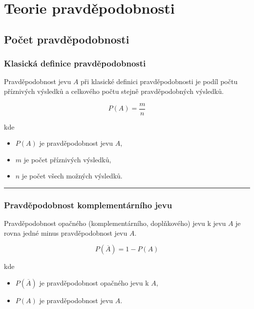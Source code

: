 \documentclass[a4paper, 11pt]{article}
\begin{document}
\clearpage
\section{Teorie pravděpodobnosti}

\subsection{Počet pravděpodobnosti}

\subsubsection{Klasická definice pravděpodobnosti}

Pravděpodobnost jevu $A$ při klasické definici pravděpodobnosti
je podíl počtu příznivých výsledků a celkového počtu
stejně pravděpodobných výsledků.

\begin{equation*}
	P(A) = \frac{m}{n}
\end{equation*}

kde

\begin{itemize}[noitemsep]
	\item $P(A)$ je pravděpodobnost jevu $A$,
	\item $m$ je počet příznivých výsledků,
	\item $n$ je počet všech možných výsledků.
\end{itemize}

\noindent\hrule\medskip

\subsubsection{Pravděpodobnost komplementárního jevu}

Pravděpodobnost opačného (komplementárního, doplňkového) jevu k jevu $A$
je rovna jedné minus pravděpodobnost jevu $A$.

\begin{equation*}
	P(\overline{A}) = 1 - P(A)
\end{equation*}

kde

\begin{itemize}[noitemsep]
	\item $P(\overline{A})$ je pravděpodobnost opačného jevu k $A$,
	\item $P(A)$ je pravděpodobnost jevu $A$.
\end{itemize}
\end{document}
